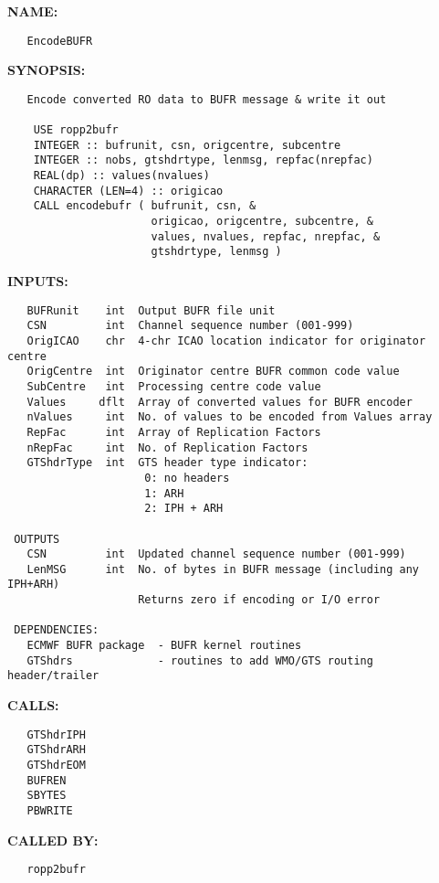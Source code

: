 \label{ch:robo99}
\label{ch:ropp2bufr_EncodeBUFR_ec}
\textbf{NAME:}\hspace{0.08in}\begin{Verbatim}
   EncodeBUFR
\end{Verbatim}
\textbf{SYNOPSIS:}\hspace{0.08in}\begin{Verbatim}
   Encode converted RO data to BUFR message & write it out

    USE ropp2bufr
    INTEGER :: bufrunit, csn, origcentre, subcentre
    INTEGER :: nobs, gtshdrtype, lenmsg, repfac(nrepfac)
    REAL(dp) :: values(nvalues)
    CHARACTER (LEN=4) :: origicao
    CALL encodebufr ( bufrunit, csn, &
                      origicao, origcentre, subcentre, &
                      values, nvalues, repfac, nrepfac, &
                      gtshdrtype, lenmsg )
\end{Verbatim}
\textbf{INPUTS:}\hspace{0.08in}\begin{Verbatim}
   BUFRunit    int  Output BUFR file unit
   CSN         int  Channel sequence number (001-999)
   OrigICAO    chr  4-chr ICAO location indicator for originator centre
   OrigCentre  int  Originator centre BUFR common code value
   SubCentre   int  Processing centre code value
   Values     dflt  Array of converted values for BUFR encoder
   nValues     int  No. of values to be encoded from Values array
   RepFac      int  Array of Replication Factors
   nRepFac     int  No. of Replication Factors
   GTShdrType  int  GTS header type indicator:
                     0: no headers
                     1: ARH
                     2: IPH + ARH

 OUTPUTS
   CSN         int  Updated channel sequence number (001-999)
   LenMSG      int  No. of bytes in BUFR message (including any IPH+ARH)
                    Returns zero if encoding or I/O error

 DEPENDENCIES:
   ECMWF BUFR package  - BUFR kernel routines
   GTShdrs             - routines to add WMO/GTS routing header/trailer
\end{Verbatim}
\textbf{CALLS:}\hspace{0.08in}\begin{Verbatim}
   GTShdrIPH
   GTShdrARH
   GTShdrEOM
   BUFREN
   SBYTES
   PBWRITE
\end{Verbatim}
\textbf{CALLED BY:}\hspace{0.08in}\begin{Verbatim}
   ropp2bufr
\end{Verbatim}
